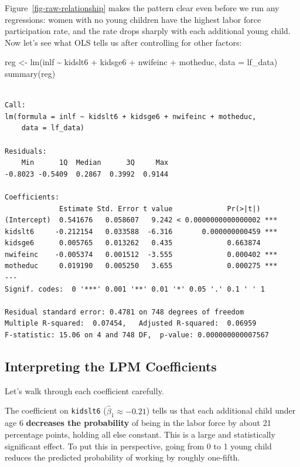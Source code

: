 \documentclass[
  letterpaper,
  DIV=11,
  numbers=noendperiod]{scrreprt}
\newenvironment{Shaded}{\begin{snugshade}}{\end{snugshade}}
\newcommand{\AttributeTok}[1]{\textcolor[rgb]{0.40,0.45,0.13}{#1}}
\newcommand{\FunctionTok}[1]{\textcolor[rgb]{0.28,0.35,0.67}{#1}}
\newcommand{\NormalTok}[1]{\textcolor[rgb]{0.00,0.23,0.31}{#1}}
\newcommand{\OtherTok}[1]{\textcolor[rgb]{0.00,0.23,0.31}{#1}}
\newcommand{\SpecialCharTok}[1]{\textcolor[rgb]{0.37,0.37,0.37}{#1}}
\begin{document}
Figure~\ref{fig-raw-relationship} makes the pattern clear even before we
run any regressions: women with no young children have the highest labor
force participation rate, and the rate drops sharply with each
additional young child. Now let's see what OLS tells us after
controlling for other factors:

\begin{Shaded}
\begin{Highlighting}[]
\NormalTok{reg }\OtherTok{\textless{}{-}} \FunctionTok{lm}\NormalTok{(inlf }\SpecialCharTok{\textasciitilde{}}\NormalTok{ kidslt6 }\SpecialCharTok{+}\NormalTok{ kidsge6 }\SpecialCharTok{+}\NormalTok{ nwifeinc }\SpecialCharTok{+}\NormalTok{ motheduc, }\AttributeTok{data =}\NormalTok{ lf\_data)}
\FunctionTok{summary}\NormalTok{(reg)}
\end{Highlighting}
\end{Shaded}

\begin{verbatim}

Call:
lm(formula = inlf ~ kidslt6 + kidsge6 + nwifeinc + motheduc, 
    data = lf_data)

Residuals:
    Min      1Q  Median      3Q     Max 
-0.8023 -0.5409  0.2867  0.3992  0.9144 

Coefficients:
             Estimate Std. Error t value             Pr(>|t|)    
(Intercept)  0.541676   0.058607   9.242 < 0.0000000000000002 ***
kidslt6     -0.212154   0.033588  -6.316       0.000000000459 ***
kidsge6      0.005765   0.013262   0.435             0.663874    
nwifeinc    -0.005374   0.001512  -3.555             0.000402 ***
motheduc     0.019190   0.005250   3.655             0.000275 ***
---
Signif. codes:  0 '***' 0.001 '**' 0.01 '*' 0.05 '.' 0.1 ' ' 1

Residual standard error: 0.4781 on 748 degrees of freedom
Multiple R-squared:  0.07454,   Adjusted R-squared:  0.06959 
F-statistic: 15.06 on 4 and 748 DF,  p-value: 0.000000000007567
\end{verbatim}

\subsection{Interpreting the LPM
Coefficients}\label{interpreting-the-lpm-coefficients}

Let's walk through each coefficient carefully.

The coefficient on \texttt{kidslt6} (\(\hat{\beta}_1 \approx -0.21\))
tells us that each additional child under age 6 \textbf{decreases the
probability} of being in the labor force by about 21 percentage points,
holding all else constant. This is a large and statistically significant
effect. To put this in perspective, going from 0 to 1 young child
reduces the predicted probability of working by roughly one-fifth.
\end{document}
